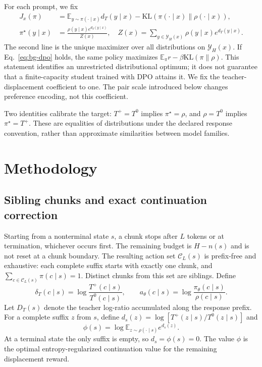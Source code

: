\documentclass[pdflatex,sn-mathphys-num,review]{sn-jnl}
\theoremstyle{thmstyleone}
\theoremstyle{thmstyletwo}
\theoremstyle{thmstylethree}
\providecommand{\Tp}{T^{+}}
\providecommand{\Tz}{T^{0}}
\providecommand{\pth}{\pi_{\theta}}
\providecommand{\popt}{\pi^{\star}}
\providecommand{\E}{\mathbb{E}}
\providecommand{\KL}{\mathrm{KL}}
\providecommand{\Cset}{\mathcal{C}}
\providecommand{\Yset}{\mathcal{Y}}
\begin{document}
For each prompt, we fix
\begin{equation}
\begin{aligned}
J_x(\pi)&=\E_{y\sim\pi(\cdot\mid x)}d_T(y\mid x)-\KL(\pi(\cdot\mid x)\|\rho(\cdot\mid x)),\\
\popt(y\mid x)&=\frac{\rho(y\mid x)e^{d_T(y\mid x)}}{Z(x)},
\quad Z(x)=\sum_{y\in\Yset_H(x)}\rho(y\mid x)e^{d_T(y\mid x)}.
\end{aligned}
\label{eq:bg-target}
\end{equation}
The second line is the unique maximizer over all distributions on $\Yset_H(x)$. If Eq.~\eqref{eq:bg-dpo} holds, the same policy maximizes $\E_\pi r-\beta\KL(\pi\|\rho)$. This statement identifies an unrestricted distributional optimum; it does not guarantee that a finite-capacity student trained with DPO attains it. We fix the teacher-displacement coefficient to one. The pair scale introduced below changes preference encoding, not this coefficient.

Two identities calibrate the target: $\Tp=\Tz$ implies $\popt=\rho$, and $\rho=\Tz$ implies $\popt=\Tp$. These are equalities of distributions under the declared response convention, rather than approximate similarities between model families.

\section{Methodology}
\label{sec:method}

\subsection{Sibling chunks and exact continuation correction}
\label{subsec:chunks}
Starting from a nonterminal state $s$, a chunk stops after $L$ tokens or at termination, whichever occurs first. The remaining budget is $H-n(s)$ and is not reset at a chunk boundary. The resulting action set $\Cset_L(s)$ is prefix-free and exhaustive: each complete suffix starts with exactly one chunk, and $\sum_{c\in\Cset_L(s)}\pi(c\mid s)=1$. Distinct chunks from this set are siblings. Define
\begin{equation}
\delta_T(c\mid s)=\log\frac{\Tp(c\mid s)}{\Tz(c\mid s)},
\qquad a_\theta(c\mid s)=\log\frac{\pth(c\mid s)}{\rho(c\mid s)}.
\label{eq:chunk-ratios}
\end{equation}
Let $D_T(s)$ denote the teacher log-ratio accumulated along the response prefix. For a complete suffix $z$ from $s$, define $d_s(z)=\log[\Tp(z\mid s)/\Tz(z\mid s)]$ and
\begin{equation}
\phi(s)=\log\E_{z\sim\rho(\cdot\mid s)}e^{d_s(z)}.
\label{eq:phi}
\end{equation}
At a terminal state the only suffix is empty, so $d_s=\phi(s)=0$. The value $\phi$ is the optimal entropy-regularized continuation value for the remaining displacement reward.
\end{document}
